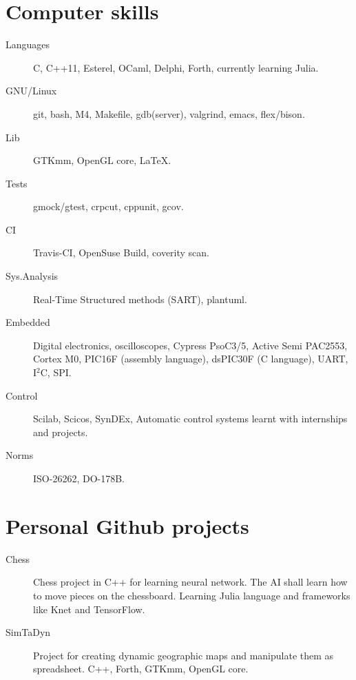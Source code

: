 \documentclass{crcv}
\begin{document}
\section{\textcolor{fortitle}{Comp}uter skills}
\begin{description}
\item[\textcolor{fortitle}{Languages}] C, C++11, Esterel, OCaml, Delphi, Forth, currently learning Julia.
\item[\textcolor{fortitle}{GNU/Linux}] git, bash, M4, Makefile, gdb(server), valgrind, emacs, flex/bison.
\item[\textcolor{fortitle}{Lib}] GTKmm, OpenGL core, \LaTeX.
\item[\textcolor{fortitle}{Tests}] gmock/gtest, crpcut, cppunit, gcov.
\item[\textcolor{fortitle}{CI}] Travis-CI, OpenSuse Build, coverity scan.
\item[\textcolor{fortitle}{Sys.\;Analysis}] Real-Time Structured methods (SART), plantuml.
\item[\textcolor{fortitle}{Embedded}] Digital electronics, oscilloscopes, Cypress PsoC3/5,
  Active Semi PAC2553, Cortex M0, PIC16F (assembly language), dsPIC30F
  (C language), UART, I$^2$C, SPI.
\item[\textcolor{fortitle}{Control}] Scilab, Scicos, SynDEx, Automatic control systems learnt with internships and projects.
\item[\textcolor{fortitle}{Norms}] ISO-26262, DO-178B.
\end{description}

\section{\textcolor{fortitle}{Pers}onal Github projects}

\begin{description}
\item[\textcolor{fortitle}{Chess}] Chess project in C++ for learning
  neural network. The AI shall learn how to move pieces on the
  chessboard.  Learning Julia language and frameworks like Knet and
  TensorFlow.
\end{description}

\begin{description}
\item[\textcolor{fortitle}{SimTaDyn}] Project for creating dynamic
  geographic maps and manipulate them as spreadsheet. C++, Forth,
  GTKmm, OpenGL core.
\end{description}
\end{document}
